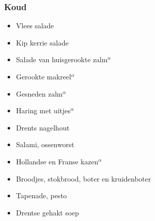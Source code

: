 \subsubsection*{Koud}
\begin{itemize}
	\item	Vlees salade
	\item	Kip kerrie salade
	\item	Salade van huisgerookte zalm$^{\alpha}$
	\item	Gerookte makreel$^{\alpha}$
	\item	Gesneden zalm$^{\alpha}$
	\item	Haring met uitjes$^{\alpha}$
	\item	Drents nagelhout
	\item	Salami, ossenworst
	\item	Hollandse en Franse kazen$^{\alpha}$
	\item	Broodjes, stokbrood, boter en kruidenboter
	\item	Tapenade, pesto
	\item	Drentse gehakt soep
\end{itemize}
